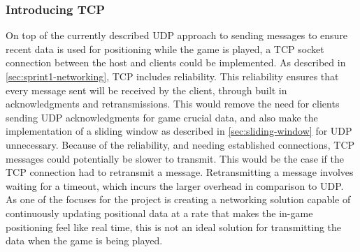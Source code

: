 \subsubsection{Introducing TCP}
On top of the currently described UDP approach to sending messages to ensure recent data is used for positioning while the game is played, a TCP socket connection between the host and clients could be implemented.
As described in \autoref{sec:sprint1-networking}, TCP includes reliability.
This reliability ensures that every message sent will be received by the client, through built in acknowledgments and retransmissions.
This would remove the need for clients sending UDP acknowledgments for game crucial data, and also make the implementation of a sliding window as described in \autoref{sec:sliding-window} for UDP unnecessary.
Because of the reliability, and needing established connections, TCP messages could potentially be slower to transmit.
This would be the case if the TCP connection had to retransmit a message.
Retransmitting a message involves waiting for a timeout, which incurs the larger overhead in comparison to UDP. 
As one of the focuses for the project is creating a networking solution capable of continuously updating positional data at a rate that makes the in-game positioning feel like real time, this is not an ideal solution for transmitting the data when the game is being played.
